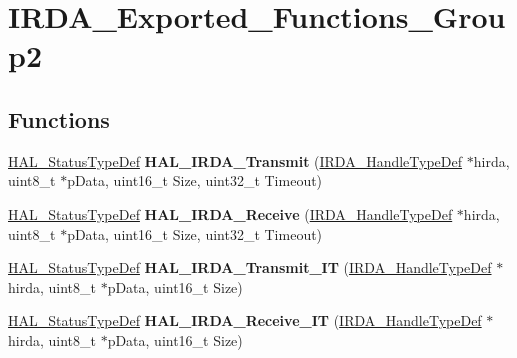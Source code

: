 \hypertarget{group___i_r_d_a___exported___functions___group2}{}\section{I\+R\+D\+A\+\_\+\+Exported\+\_\+\+Functions\+\_\+\+Group2}
\label{group___i_r_d_a___exported___functions___group2}
\subsection*{Functions}
\begin{DoxyCompactItemize}
\item 
\hyperlink{stm32f4xx__hal__def_8h_a63c0679d1cb8b8c684fbb0632743478f}{H\+A\+L\+\_\+\+Status\+Type\+Def} {\bfseries H\+A\+L\+\_\+\+I\+R\+D\+A\+\_\+\+Transmit} (\hyperlink{struct_i_r_d_a___handle_type_def}{I\+R\+D\+A\+\_\+\+Handle\+Type\+Def} $\ast$hirda, uint8\+\_\+t $\ast$p\+Data, uint16\+\_\+t Size, uint32\+\_\+t Timeout)\hypertarget{group___i_r_d_a___exported___functions___group2_ga8581077ae166780a2bd0c8d9b38c1ab2}{}\label{group___i_r_d_a___exported___functions___group2_ga8581077ae166780a2bd0c8d9b38c1ab2}

\item 
\hyperlink{stm32f4xx__hal__def_8h_a63c0679d1cb8b8c684fbb0632743478f}{H\+A\+L\+\_\+\+Status\+Type\+Def} {\bfseries H\+A\+L\+\_\+\+I\+R\+D\+A\+\_\+\+Receive} (\hyperlink{struct_i_r_d_a___handle_type_def}{I\+R\+D\+A\+\_\+\+Handle\+Type\+Def} $\ast$hirda, uint8\+\_\+t $\ast$p\+Data, uint16\+\_\+t Size, uint32\+\_\+t Timeout)\hypertarget{group___i_r_d_a___exported___functions___group2_ga4148e8cd07056a07a827c537f2f7823c}{}\label{group___i_r_d_a___exported___functions___group2_ga4148e8cd07056a07a827c537f2f7823c}

\item 
\hyperlink{stm32f4xx__hal__def_8h_a63c0679d1cb8b8c684fbb0632743478f}{H\+A\+L\+\_\+\+Status\+Type\+Def} {\bfseries H\+A\+L\+\_\+\+I\+R\+D\+A\+\_\+\+Transmit\+\_\+\+IT} (\hyperlink{struct_i_r_d_a___handle_type_def}{I\+R\+D\+A\+\_\+\+Handle\+Type\+Def} $\ast$hirda, uint8\+\_\+t $\ast$p\+Data, uint16\+\_\+t Size)\hypertarget{group___i_r_d_a___exported___functions___group2_gac6ea111f9cf4b8a89059708e2e8f1b81}{}\label{group___i_r_d_a___exported___functions___group2_gac6ea111f9cf4b8a89059708e2e8f1b81}

\item 
\hyperlink{stm32f4xx__hal__def_8h_a63c0679d1cb8b8c684fbb0632743478f}{H\+A\+L\+\_\+\+Status\+Type\+Def} {\bfseries H\+A\+L\+\_\+\+I\+R\+D\+A\+\_\+\+Receive\+\_\+\+IT} (\hyperlink{struct_i_r_d_a___handle_type_def}{I\+R\+D\+A\+\_\+\+Handle\+Type\+Def} $\ast$hirda, uint8\+\_\+t $\ast$p\+Data, uint16\+\_\+t Size)\hypertarget{group___i_r_d_a___exported___functions___group2_ga0ea98454afb5ec16a39ba1b5b8142005}{}\label{group___i_r_d_a___exported___functions___group2_ga0ea98454afb5ec16a39ba1b5b8142005}


\end{DoxyCompactItemize}
